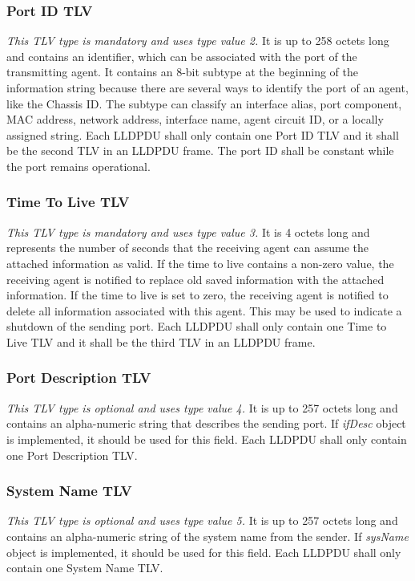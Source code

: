 \subsubsection{Port ID TLV}
\label{Section:LLDP-PortID}
\textit{This TLV type is mandatory and uses type value 2.} It is up to 258 octets long and contains an identifier, which can be associated with the port of the transmitting agent. It contains an 8-bit subtype at the beginning of the information string because there are several ways to identify the port of an agent, like the Chassis ID. The subtype can classify an interface alias, port component, MAC address, network address, interface name, agent circuit ID, or a locally assigned string. Each LLDPDU shall only contain one Port ID TLV and it shall be the second TLV in an LLDPDU frame. The port ID shall be constant while the port remains operational.

\subsubsection{Time To Live TLV}
\label{Section:LLDP-TimeToLive}
\textit{This TLV type is mandatory and uses type value 3.} It is 4 octets long and represents the number of seconds that the receiving agent can assume the attached information as valid. If the time to live contains a non-zero value, the receiving agent is notified to replace old saved information with the attached information. If the time to live is set to zero, the receiving agent is notified to delete all information associated with this agent. This may be used to indicate a shutdown of the sending port. Each LLDPDU shall only contain one Time to Live TLV and it shall be the third TLV in an LLDPDU frame.

\subsubsection{Port Description TLV}
\label{Section:LLDP-PortDescription}
\textit{This TLV type is optional and uses type value 4.} It is up to 257 octets long and contains an alpha-numeric string that describes the sending port. If \textit{ifDesc} object \cite{RFC:RFC2863:2000} is implemented, it should be used for this field. Each LLDPDU shall only contain one Port Description TLV.

\subsubsection{System Name TLV}
\label{Section:LLDP-SystemName}
\textit{This TLV type is optional and uses type value 5.} It is up to 257 octets long and contains an alpha-numeric string of the system name from the sender. If \textit{sysName} object \cite{RFC:RFC3418:2002} is implemented, it should be used for this field. Each LLDPDU shall only contain one System Name TLV.

